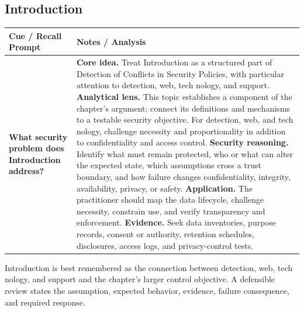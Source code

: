 \documentclass[11pt]{article}
\newcommand{\CornellHeader}{%
\rowcolor{Navy}\color{white}\bfseries Cue / Recall Prompt & \color{white}\bfseries Notes / Analysis\\\hline}
\newcommand{\CornellRow}[2]{%
\cellcolor{CueGray}\RaggedRight\textbf{#1} & \RaggedRight #2\\\hline}
\begin{document}
\subsection*{Introduction}
\begin{longtable}{>{\RaggedRight\arraybackslash}p{}|>{\RaggedRight\arraybackslash}p{}}
\CornellHeader
\CornellRow{What security problem does Introduction address?}{\textbf{Core idea.} Treat Introduction as a structured part of Detection of Conflicts in Security Policies, with particular attention to detection, web, tech nology, and support. \textbf{Analytical lens.} This topic establishes a component of the chapter's argument; connect its definitions and mechanisms to a testable security objective. For detection, web, and tech nology, challenge necessity and proportionality in addition to confidentiality and access control. \textbf{Security reasoning.} Identify what must remain protected, who or what can alter the expected state, which assumptions cross a trust boundary, and how failure changes confidentiality, integrity, availability, privacy, or safety. \textbf{Application.} The practitioner should map the data lifecycle, challenge necessity, constrain use, and verify transparency and enforcement. \textbf{Evidence.} Seek data inventories, purpose records, consent or authority, retention schedules, disclosures, access logs, and privacy-control tests.}
\end{longtable}
\begin{topicsummary}
Introduction is best remembered as the connection between detection, web, tech nology, and support and the chapter's larger control objective. A defensible review states the assumption, expected behavior, evidence, failure consequence, and required response.
\end{topicsummary}
\end{document}

